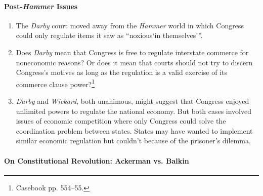 \paragraph{Post-\emph{Hammer} Issues}

\begin{enumerate}
    \item The \emph{Darby} court moved away from the \emph{Hammer} world in 
    which Congress could only regulate items it saw as 
    \enquote{noxious\enquote{in themselves}}.
    \item Does \emph{Darby} mean that Congress is free to regulate interstate 
    commerce for noneconomic reasons? Or does it mean that courts should 
    not try to discern Congress's motives as long as the regulation is a valid 
    exercise of its commerce clause power?\footnote{Casebook pp. 554--55.}
    \item \emph{Darby} and \emph{Wickard}, both unanimous, might suggest that 
    Congress enjoyed unlimited powers to regulate the national economy. But 
    both cases involved issues of economic competition where only Congress 
    could solve the coordination problem between states. States may have 
    wanted to implement similar economic regulation but couldn't because of 
    the prisoner's dilemma.
\end{enumerate}

\paragraph{On Constitutional Revolution: Ackerman vs. Balkin}

